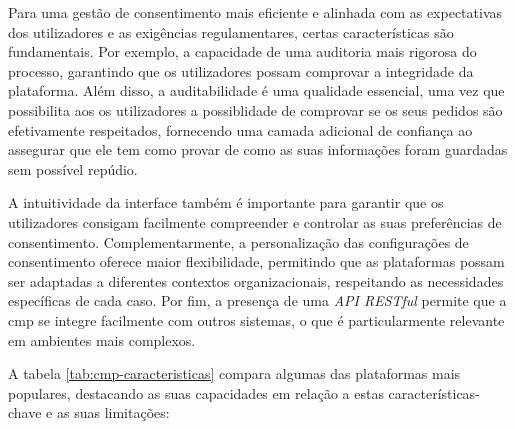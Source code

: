 Para uma gestão de consentimento mais eficiente e alinhada com as expectativas dos utilizadores e as exigências regulamentares, certas características são fundamentais.
Por exemplo, a capacidade de uma auditoria mais rigorosa do processo, garantindo que os utilizadores possam comprovar a integridade da plataforma.
Além disso, a auditabilidade é uma qualidade essencial, uma vez que possibilita aos os utilizadores a possiblidade de comprovar se os seus pedidos são efetivamente respeitados, fornecendo uma camada adicional de confiança ao assegurar que ele tem como provar de como as suas informações foram guardadas sem possível repúdio.

A intuitividade da interface também é importante para garantir que os utilizadores consigam facilmente compreender e controlar as suas preferências de consentimento.
Complementarmente, a personalização das configurações de consentimento oferece maior flexibilidade, permitindo que as plataformas possam ser adaptadas a diferentes contextos organizacionais, respeitando as necessidades específicas de cada caso.
Por fim, a presença de uma \textit{API RESTful} permite que a \acrshort{cmp} se integre facilmente com outros sistemas, o que é particularmente relevante em ambientes mais complexos.

A tabela \ref{tab:cmp-caracteristicas} compara algumas das plataformas mais populares, destacando as suas capacidades em relação a estas características-chave e as suas limitações:

\label{tab:cmp-caracteristicas}
\begin{table}[H]
\centering
\caption{Comparação das principais características das \acrshort{cmp}s existentes}
\end{table}


